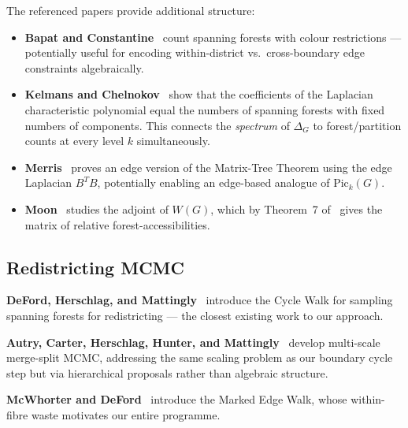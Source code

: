 \documentclass[11pt]{article}
\begin{document}
The referenced papers provide additional structure:
\begin{itemize}
  \item \textbf{Bapat and Constantine}~\cite{bapat1992enumerating} count
    spanning forests with colour restrictions --- potentially useful for
    encoding within-district vs.\ cross-boundary edge constraints algebraically.
  \item \textbf{Kelmans and Chelnokov}~\cite{kelmans1974polynomial} show that
    the coefficients of the Laplacian characteristic polynomial equal the
    numbers of spanning forests with fixed numbers of components. This connects
    the \emph{spectrum} of $\Delta_G$ to forest/partition counts at every level
    $k$ simultaneously.
  \item \textbf{Merris}~\cite{merris1989edge} proves an edge version of the
    Matrix-Tree Theorem using the edge Laplacian $B^T B$, potentially enabling
    an edge-based analogue of $\mathrm{Pic}_k(G)$.
  \item \textbf{Moon}~\cite{moon1995adjoint} studies the adjoint of $W(G)$,
    which by Theorem~7 of~\cite{chebotarev2006forest} gives the matrix of
    relative forest-accessibilities.
\end{itemize}

\subsection{Redistricting MCMC}

\textbf{DeFord, Herschlag, and Mattingly}~\cite{deford2025cycle} introduce
the Cycle Walk for sampling spanning forests for redistricting --- the closest
existing work to our approach.

\textbf{Autry, Carter, Herschlag, Hunter, and
Mattingly}~\cite{autry2020multiscale} develop multi-scale merge-split MCMC,
addressing the same scaling problem as our boundary cycle step but via
hierarchical proposals rather than algebraic structure.

\textbf{McWhorter and DeFord}~\cite{mew} introduce the Marked Edge Walk, whose
within-fibre waste motivates our entire programme.
\end{document}
